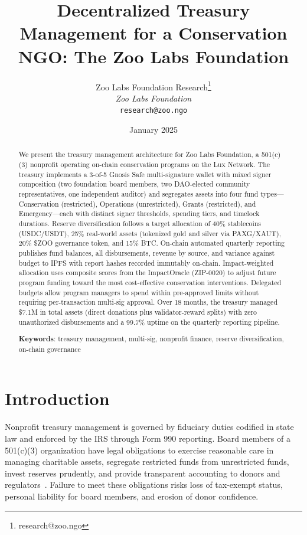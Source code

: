 \documentclass[11pt,letterpaper]{article}
\title{\textbf{Decentralized Treasury Management for a Conservation NGO: The Zoo Labs Foundation}}
\author{
Zoo Labs Foundation Research\thanks{research@zoo.ngo}\\
\textit{Zoo Labs Foundation}\\
\texttt{research@zoo.ngo}
}
\date{January 2025}
\begin{document}
\zoocoverpage

\begin{abstract}
We present the treasury management architecture for Zoo Labs Foundation, a 501(c)(3) nonprofit operating on-chain conservation programs on the Lux Network. The treasury implements a 3-of-5 Gnosis Safe multi-signature wallet with mixed signer composition (two foundation board members, two DAO-elected community representatives, one independent auditor) and segregates assets into four fund types---Conservation (restricted), Operations (unrestricted), Grants (restricted), and Emergency---each with distinct signer thresholds, spending tiers, and timelock durations. Reserve diversification follows a target allocation of 40\% stablecoins (USDC/USDT), 25\% real-world assets (tokenized gold and silver via PAXG/XAUT), 20\% \$ZOO governance token, and 15\% BTC. On-chain automated quarterly reporting publishes fund balances, all disbursements, revenue by source, and variance against budget to IPFS with report hashes recorded immutably on-chain. Impact-weighted allocation uses composite scores from the ImpactOracle (ZIP-0020) to adjust future program funding toward the most cost-effective conservation interventions. Delegated budgets allow program managers to spend within pre-approved limits without requiring per-transaction multi-sig approval. Over 18 months, the treasury managed \$7.1M in total assets (direct donations plus validator-reward splits) with zero unauthorized disbursements and a 99.7\% uptime on the quarterly reporting pipeline.

\textbf{Keywords}: treasury management, multi-sig, nonprofit finance, reserve diversification, on-chain governance
\end{abstract}

\section{Introduction}

Nonprofit treasury management is governed by fiduciary duties codified in state law and enforced by the IRS through Form 990 reporting. Board members of a 501(c)(3) organization have legal obligations to exercise reasonable care in managing charitable assets, segregate restricted funds from unrestricted funds, invest reserves prudently, and provide transparent accounting to donors and regulators~\cite{irs557}. Failure to meet these obligations risks loss of tax-exempt status, personal liability for board members, and erosion of donor confidence.
\end{document}
